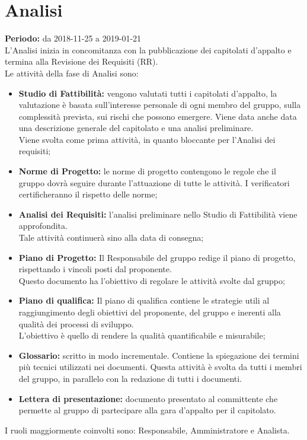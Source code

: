 \section{Analisi}
\textbf{Periodo:} da 2018-11-25 a 2019-01-21\\L'Analisi inizia in concomitanza con la pubblicazione dei capitolati d’appalto e termina alla Revisione dei Requisiti (RR).\\
Le attività della fase di Analisi sono:
\begin{itemize}
    \item \textbf{Studio di Fattibilità:} vengono valutati tutti i capitolati d'appalto, la valutazione è basata sull'interesse personale di ogni membro del gruppo, sulla complessità prevista, sui rischi che possono emergere. Viene data anche data una descrizione generale del capitolato e una analisi preliminare.\\Viene svolta come prima attività, in quanto bloccante per l'Analisi dei requisiti;
    \item \textbf{Norme di Progetto:} le norme di progetto contengono le regole che il gruppo dovrà seguire durante l'attuazione di tutte le attività. I verificatori certificheranno il rispetto delle norme;
    \item \textbf{Analisi dei Requisiti:} l'analisi preliminare nello Studio di Fattibilità viene approfondita.\\Tale attività continuerà sino alla data di consegna;
    \item \textbf{Piano di Progetto:} Il Responsabile del gruppo redige il piano di progetto, rispettando i vincoli posti dal proponente.\\Questo documento ha l'obiettivo di regolare le attività svolte dal gruppo;
    \item \textbf{Piano di qualifica:} Il piano di qualifica contiene le strategie utili al raggiungimento degli obiettivi del proponente, del gruppo e inerenti alla qualità dei processi di sviluppo.\\L'obiettivo è quello di rendere la qualità quantificabile e misurabile;
    \item \textbf{Glossario:} scritto in modo incrementale. Contiene la spiegazione dei termini più tecnici utilizzati nei documenti. Questa attività è svolta da tutti i membri del gruppo, in parallelo con la redazione di tutti i documenti.
    \item \textbf{Lettera di presentazione:} documento presentato al committente che permette al gruppo di partecipare alla gara d’appalto per il capitolato.
\end{itemize}
I ruoli maggiormente coinvolti sono: Responsabile, Amministratore e Analista.
